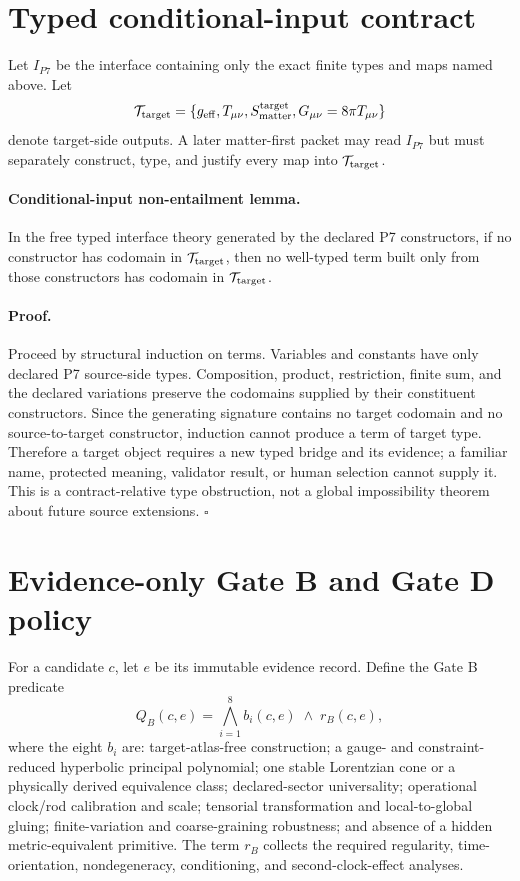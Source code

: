 \documentclass[11pt]{article}
\begin{document}
\section{Typed conditional-input contract}

Let $I_{P7}$ be the interface containing only the exact finite types and maps
named above. Let
\[
  \mathcal T_{\rm target}=\{g_{\rm eff},T_{\mu\nu},
  S_{\rm matter}^{\rm target},G_{\mu\nu}=8\pi T_{\mu\nu}\}
\]
denote target-side outputs. A later matter-first packet may read $I_{P7}$ but
must separately construct, type, and justify every map into
$\mathcal T_{\rm target}$.

\paragraph{Conditional-input non-entailment lemma.}
In the free typed interface theory generated by the declared P7 constructors,
if no constructor has codomain in $\mathcal T_{\rm target}$, then no well-typed
term built only from those constructors has codomain in
$\mathcal T_{\rm target}$.

\paragraph{Proof.}
Proceed by structural induction on terms. Variables and constants have only
declared P7 source-side types. Composition, product, restriction, finite sum,
and the declared variations preserve the codomains supplied by their
constituent constructors. Since the generating signature contains no target
codomain and no source-to-target constructor, induction cannot produce a term
of target type. Therefore a target object requires a new typed bridge and its
evidence; a familiar name, protected meaning, validator result, or human
selection cannot supply it. This is a contract-relative type obstruction, not
a global impossibility theorem about future source extensions. $\square$

\section{Evidence-only Gate B and Gate D policy}

For a candidate $c$, let $e$ be its immutable evidence record. Define the Gate
B predicate
\[
Q_B(c,e)=\bigwedge_{i=1}^{8} b_i(c,e)\;\wedge\;r_B(c,e),
\]
where the eight $b_i$ are: target-atlas-free construction; a gauge- and
constraint-reduced hyperbolic principal polynomial; one stable Lorentzian cone
or a physically derived equivalence class; declared-sector universality;
operational clock/rod calibration and scale; tensorial transformation and
local-to-global gluing; finite-variation and coarse-graining robustness; and
absence of a hidden metric-equivalent primitive. The term $r_B$ collects the
required regularity, time-orientation, nondegeneracy, conditioning, and
second-clock-effect analyses.
\end{document}
